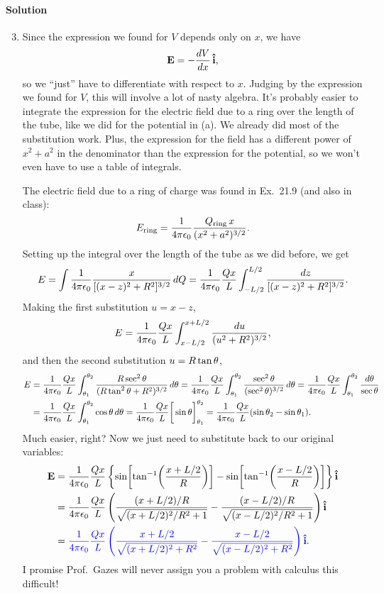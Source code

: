 \documentclass[11pt]{article}
\newcommand{\beq}{\begin{equation*}}
\newcommand{\eeq}{\end{equation*}}
\newenvironment{solution}
{
    \paragraph{Solution}
    \ignorespaces
}
{
    \bigskip
}
\begin{document}
\begin{solution}
\begin{enumerate}
		
		\setcounter{enumi}{2}
		
		\newcommand{\Aq}{A_1}
		\newcommand{\Aw}{A_2}
		\newcommand{\Bq}{B_1}
		\newcommand{\Bw}{B_2}

		\clearpage
		\item Since the expression we found for $V$ depends only on $x$, we have
		\beq
			\vE = -\dv{V}{x} \,\ih,
		\eeq
		so we ``just'' have to differentiate with respect to $x$.  Judging by the expression we found for $V$, this will involve a lot of nasty algebra.  It's probably easier to integrate the expression for the electric field due to a ring over the length of the tube, like we did for the potential in (a).  We already did most of the substitution work.  Plus, the expression for the field has a different power of $x^2 + a^2$ in the denominator than the expression for the potential, so we won't even have to use a table of integrals.

		The electric field due to a ring of charge was found in Ex.~21.9 (and also in class):
		\beq
			E_\text{ring} = \fk \frac{Q_\text{ring} \, x}{(x^2 + a^2)^{3/2}}.
		\eeq
		Setting up the integral over the length of the tube as we did before, we get
		\beq
			E = \int \fk \frac{x}{[(x-z)^2 + R^2]^{3/2}} \dQ
			= \fk \frac{Q x}{L} \int_{-L/2}^{L/2} \frac{\dz}{[(x-z)^2 + R^2]^{3/2}}.
		\eeq
		Making the first substitution $u = x - z$,
		\beq
			E = \fk \frac{Q x}{L} \int_{x - L/2}^{x + L/2} \frac{\du}{(u^2 + R^2)^{3/2}},
		\eeq
		and then the second substitution $u = R \tan\theta$,
		\begin{align*}
			E &= \frac{1}{4\pi\epsilon_0} \frac{Q x}{L} \int_{\theta_1}^{\theta_2} \frac{R \sec^2\theta}{(R \tan^2\theta + R^2)^{3/2}} \dd{\theta}
			= \frac{1}{4\pi\epsilon_0} \frac{Q x}{L} \int_{\theta_1}^{\theta_2} \frac{\sec^2\theta}{(\sec^2\theta)^{3/2}} \dd{\theta}
			= \frac{1}{4\pi\epsilon_0} \frac{Q x}{L} \int_{\theta_1}^{\theta_2} \frac{\dd{\theta}}{\sec\theta} \\
			&= \frac{1}{4\pi\epsilon_0} \frac{Q x}{L} \int_{\theta_1}^{\theta_2} \cos\theta \dd{\theta}
			= \frac{1}{4\pi\epsilon_0} \frac{Q x}{L} \bigg[ \sin\theta \bigg]_{\theta_1}^{\theta_2}
			= \frac{1}{4\pi\epsilon_0} \frac{Q x}{L} (\sin\theta_2 - \sin\theta_1).
		\end{align*}
		Much easier, right?  Now we just need to substitute back to our original variables:
		\begin{align*}
			\mathbf{E} &= \frac{1}{4\pi\epsilon_0} \frac{Q x}{L} \left\{ \sin\!\left[ \tan[-1](\frac{x + L/2}{R}) \right] - \sin\!\left[ \tan[-1](\frac{x - L/2}{R}) \right] \right\} \mathbf{\hat{i}} \\
			&= \frac{1}{4\pi\epsilon_0} \frac{Q x}{L} \left( \frac{(x + L/2)/R}{\sqrt{(x + L/2)^2/R^2 + 1}} - \frac{(x - L/2)/R}{\sqrt{(x - L/2)^2/R^2 + 1}} \right) \mathbf{\hat{i}} \\
			&= {\color{blue} \frac{1}{4\pi\epsilon_0} \frac{Q x}{L} \left( \frac{x + L/2}{\sqrt{(x + L/2)^2 + R^2}} - \frac{x - L/2}{\sqrt{(x - L/2)^2 + R^2}} \right) \mathbf{\hat{i}}}.
		\end{align*}
		I promise Prof.~Gazes will never assign you a problem with calculus this difficult!
	\end{enumerate}
\end{solution}
\end{document}
